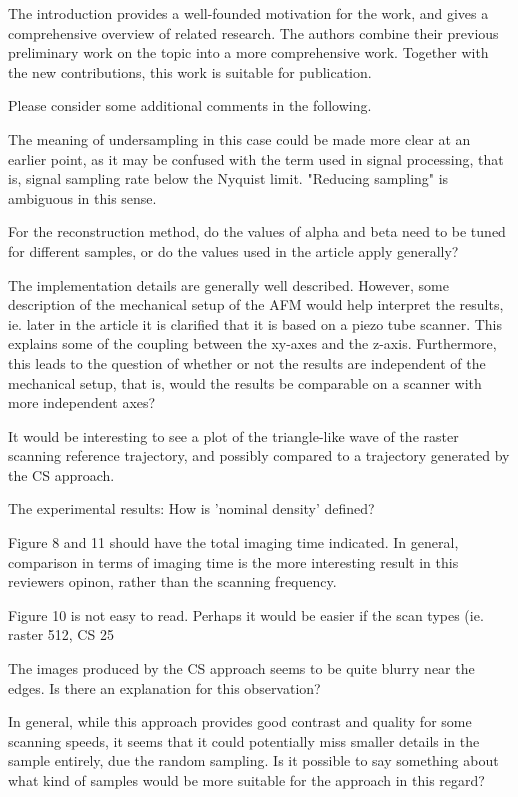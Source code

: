 \documentclass[11pt]{article} %
\begin{document}
The introduction provides a well-founded motivation for the work, and gives a comprehensive overview of related research. The authors combine their previous preliminary work on the topic into a more comprehensive work. Together with the new contributions, this work is suitable for publication.

Please consider some additional comments in the following.


The meaning of undersampling in this case could be made more clear at an earlier point, as it may be confused with the term used in signal processing, that is, signal sampling rate below the Nyquist limit. "Reducing sampling" is ambiguous in this sense.

For the reconstruction method, do the values of alpha and beta need to be tuned for different samples, or do the values used in the article apply generally?

The implementation details are generally well described. However, some description of the mechanical setup of the AFM would help interpret the results, ie. later in the article it is clarified that it is based on a piezo tube scanner. This explains some of the coupling between the xy-axes and the z-axis. Furthermore, this leads to the question of whether or not the results are independent of the mechanical setup, that is, would the results be comparable on a scanner with more independent axes?

It would be interesting to see a plot of the triangle-like wave of the raster scanning reference trajectory, and possibly compared to a trajectory generated by the CS approach.

The experimental results: How is 'nominal density' defined?

Figure 8 and 11 should have the total imaging time indicated. In general, comparison in terms of imaging time is the more interesting result in this reviewers opinon, rather than the scanning frequency.

Figure 10 is not easy to read. Perhaps it would be easier if the scan types (ie. raster 512, CS 25%

The images produced by the CS approach seems to be quite blurry near the edges. Is there an explanation for this observation?

In general, while this approach provides good contrast and quality for some scanning speeds, it seems that it could potentially miss smaller details in the sample entirely, due the random sampling. Is it possible to say something about what kind of samples would be more suitable for the approach in this regard?
\end{document}
